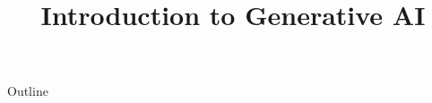 \documentclass[xcolor=dvipsnames,compress,t,pdf,9pt]{beamer}
\title[\insertframenumber /\inserttotalframenumber]{Introduction to Generative AI}
\begin{document}
	\begin{frame}
	\titlepage
	\end{frame}
	
	\begin{frame}{Outline}
	    \tableofcontents
	\end{frame}

	
	
	
\end{document}

